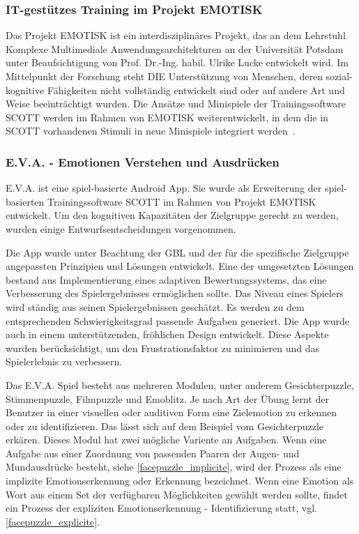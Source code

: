 \subsubsection{IT-gestützes Training im Projekt EMOTISK}
Das Projekt EMOTISK ist ein interdisziplinäres Projekt, das an dem Lehrstuhl Komplexe Multimediale Anwendungsarchitekturen an der Universität Potsdam unter Beaufsichtigung von Prof. Dr.-Ing. habil. Ulrike Lucke entwickelt wird. 
Im Mittelpunkt der Forschung steht DIE Unterstützung von Menschen, deren sozial-kognitive Fähigkeiten nicht vollständig entwickelt sind oder auf andere Art und Weise beeinträchtigt wurden. Die Ansätze und Minispiele der Trainingssoftware SCOTT werden im Rahmen von EMOTISK weiterentwickelt, in dem die in SCOTT vorhandenen Stimuli in neue Minispiele integriert werden~\cite{Zoerner.2017}.

\subsubsection{E.V.A. - Emotionen Verstehen und Ausdrücken}
E.V.A. ist eine spiel-basierte Android App. Sie wurde als Erweiterung der spiel-basierten Trainingssoftware SCOTT im Rahmen von Projekt EMOTISK~\cite{Scott} entwickelt. Um den kognitiven Kapazitäten der Zielgruppe gerecht zu werden, wurden einige Entwurfsentscheidungen vorgenommen.

Die App wurde unter Beachtung der GBL und der für die spezifische Zielgruppe angepassten Prinzipien und Lösungen entwickelt. Eine der umgesetzten Lösungen bestand aus Implementierung eines adaptiven Bewertungssystems, das eine Verbesserung des Spielergebnisses ermöglichen sollte. Das Niveau eines Spielers wird ständig aus seinen Spielergebnissen geschätzt. Es werden zu dem entsprechenden Schwierigkeitsgrad passende Aufgaben generiert.
Die App wurde auch in einem unterstützenden, fröhlichen Design entwickelt. Diese Aspekte wurden berücksichtigt, um den Frustrationsfaktor zu minimieren und das Spielerlebnis zu verbessern.

Das E.V.A. Spiel besteht aus mehreren Modulen, unter anderem Gesichterpuzzle, Stimmenpuzzle, Filmpuzzle und Emoblitz. Je nach Art der Übung lernt der Benutzer in einer visuellen oder auditiven Form eine Zielemotion zu erkennen oder zu identifizieren. Das lässt sich auf dem Beispiel vom Gesichterpuzzle erkären. Dieses Modul hat zwei mögliche Variente an Aufgaben. Wenn eine Aufgabe aus einer Zuordnung von passenden Paaren der Augen- und Mundausdrücke besteht, siehe \ref{facepuzzle_implicite}, wird der Prozess als eine implizite Emotionserkennung oder Erkennung bezeichnet. Wenn eine Emotion als Wort aus einem Set der verfügbaren Möglichkeiten gewählt werden sollte, findet ein Prozess der expliziten Emotionserkennung - Identifizierung statt, vgl.\ref{facepuzzle_explicite}.

